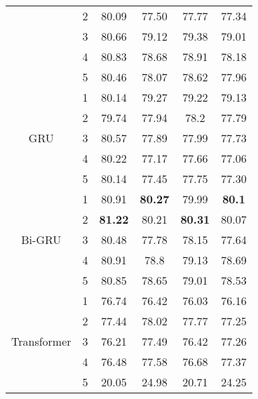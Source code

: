 \documentclass[runningheads]{llncs}
\begin{document}
\begin{table}[!hbtp]
\begin{tabular}{|c|c|c|c|c|c|}
                        & 2 & 80.09 & 77.50 & 77.77  &77.34 \\ 
                        & 3 & 80.66 & 79.12 & 79.38 & 79.01 \\ 
                        & 4 & 80.83                & 78.68                & 78.91                & 78.18                \\ 
                        & 5 & 80.46                & 78.07                & 78.62                & 77.96                \\ \hline
\multirow{5}{*}{GRU}    & 1 & 80.14                & 79.27                & 79.22                & 79.13                \\ 
                        & 2 &  79.74 &	77.94 &	78.2	& 77.79 \\ 
                        & 3 &  80.57 & 77.89 & 77.99 & 77.73\\ 
                        & 4 & 80.22 & 77.17 & 77.66 & 77.06 \\
                        & 5 & 80.14 & 77.45 & 77.75 & 77.30 \\ \hline
\multirow{5}{*}{Bi-GRU}  & 1 & 80.91                & \textbf{80.27}       & 79.99                & \textbf{80.1}        \\ 
                        & 2 & \textbf{81.22}       & 80.21                & \textbf{80.31}       & 80.07                \\ 
                        & 3 & 80.48                & 77.78                & 78.15                & 77.64                \\ 
                        & 4 & 80.91                & 78.8                 & 79.13                & 78.69                \\ 
                        & 5 & 80.85                & 78.65                & 79.01                & 78.53    \\ \hline
\multirow{5}{*}{Transformer} & 1                 & 76.74     & 76.42  & 76.03 & 76.16    \\
\multirow{5}{*}{Encoder}                               & 2                 & 77.44     & 78.02  & 77.77 & 77.25    \\ 
                             & 3                 & 76.21     & 77.49  & 76.42 & 77.26    \\ 
                             & 4                 & 76.48     & 77.58  & 76.68 & 77.37    \\ 
                             & 5                 & 20.05     & 24.98  & 20.71 & 24.25    \\ \hline
\end{tabular}
\end{table}
\end{document}
